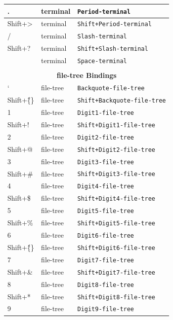\documentclass[11pt, a4paper]{article}
\begin{document}
\begin{appendices}
\begin{longtable}{|p{}|p{}|p{}|}
    . & terminal & \texttt{Period-terminal} \\ \hline
    Shift+> & terminal & \texttt{Shift+Period-terminal} \\ \hline
    / & terminal & \texttt{Slash-terminal} \\ \hline
    Shift+? & terminal & \texttt{Shift+Slash-terminal} \\ \hline
      & terminal & \texttt{Space-terminal} \\ \hline
    \multicolumn{3}{|c|}{} \\ \hline
    \multicolumn{3}{|c|}{\textbf{file-tree Bindings}} \\ \hline
    ` & file-tree & \texttt{Backquote-file-tree} \\ \hline
    Shift+\~\{\} & file-tree & \texttt{Shift+Backquote-file-tree} \\ \hline
    1 & file-tree & \texttt{Digit1-file-tree} \\ \hline
    Shift+! & file-tree & \texttt{Shift+Digit1-file-tree} \\ \hline
    2 & file-tree & \texttt{Digit2-file-tree} \\ \hline
    Shift+@ & file-tree & \texttt{Shift+Digit2-file-tree} \\ \hline
    3 & file-tree & \texttt{Digit3-file-tree} \\ \hline
    Shift+\# & file-tree & \texttt{Shift+Digit3-file-tree} \\ \hline
    4 & file-tree & \texttt{Digit4-file-tree} \\ \hline
    Shift+\$ & file-tree & \texttt{Shift+Digit4-file-tree} \\ \hline
    5 & file-tree & \texttt{Digit5-file-tree} \\ \hline
    Shift+\% & file-tree & \texttt{Shift+Digit5-file-tree} \\ \hline
    6 & file-tree & \texttt{Digit6-file-tree} \\ \hline
    Shift+\^\{\} & file-tree & \texttt{Shift+Digit6-file-tree} \\ \hline
    7 & file-tree & \texttt{Digit7-file-tree} \\ \hline
    Shift+\& & file-tree & \texttt{Shift+Digit7-file-tree} \\ \hline
    8 & file-tree & \texttt{Digit8-file-tree} \\ \hline
    Shift+* & file-tree & \texttt{Shift+Digit8-file-tree} \\ \hline
    9 & file-tree & \texttt{Digit9-file-tree} \\ \hline

\end{longtable}
\end{appendices}
\end{document}
